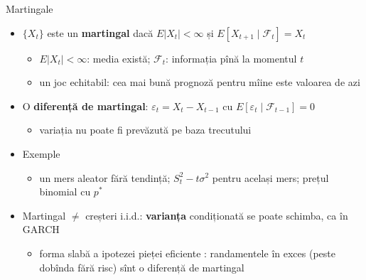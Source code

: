 \begin{frame}{Martingale}
\itemsize{\footnotesize}
\begin{itemize}
    \item $\{X_t\}$ este un \textbf{martingal} dacă $E|X_t| < \infty$ și $E[X_{t+1} \mid \mathcal{F}_t] = X_t$
    \begin{itemize}
        \item $E|X_t| < \infty$: media există; $\mathcal{F}_t$: informația pînă la momentul $t$
        \item un joc echitabil: cea mai bună prognoză pentru mîine este valoarea de azi
    \end{itemize}
    \item O \textbf{diferență de martingal}: $\varepsilon_t = X_t - X_{t-1}$ cu $E[\varepsilon_t \mid \mathcal{F}_{t-1}] = 0$
    \begin{itemize}
        \item variația nu poate fi prevăzută pe baza trecutului
    \end{itemize}
    \item Exemple
    \begin{itemize}
        \item un mers aleator fără tendință; $S_t^2 - t\sigma^2$ pentru același mers; prețul binomial cu $p^*$
    \end{itemize}
    \item Martingal $\ne$ creșteri i.i.d.: \textbf{varianța} condiționată se poate schimba, ca în GARCH
    \begin{itemize}
        \item forma slabă a ipotezei pieței eficiente : randamentele în exces (peste dobînda fără risc) sînt o diferență de martingal
    \end{itemize}
\end{itemize}
\end{frame}

